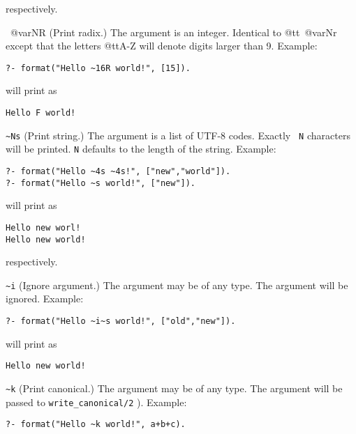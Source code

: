 \begin{description}
\begin{itemize}
{\noindent
respectively.

\item ~@var{N}R
(Print radix.) The argument is an integer.  Identical to @tt{~@var{N}r} except
that the letters @tt{A-Z} will denote digits larger than 9.  Example:  

\begin{verbatim}
?- format("Hello ~16R world!", [15]).
\end{verbatim}

\noindent
will print as

\begin{verbatim}
Hello F world!
\end{verbatim}

}

\item \verb|~Ns|
(Print string.) The argument is a list of UTF-8 codes.  Exactly {\tt
N} characters will be printed. {\tt N} defaults to the length of the
string.  Example:

\begin{verbatim}
?- format("Hello ~4s ~4s!", ["new","world"]).
?- format("Hello ~s world!", ["new"]).
\end{verbatim}

\noindent
will print as

\begin{verbatim}
Hello new worl!
Hello new world!
\end{verbatim}

\noindent
respectively.

\item \verb|~i|
(Ignore argument.) The argument may be of any type.  The argument will be
ignored.  Example:  

\begin{verbatim}
?- format("Hello ~i~s world!", ["old","new"]).
\end{verbatim}

\noindent
will print as

\begin{verbatim}
Hello new world!
\end{verbatim}

\item \verb|~k|
(Print canonical.) The argument may be of any type.  The argument will be
passed to {\tt write\_canonical/2} ).  Example:  

\begin{verbatim}
?- format("Hello ~k world!", a+b+c).
\end{verbatim}


\end{itemize}
\end{description}
